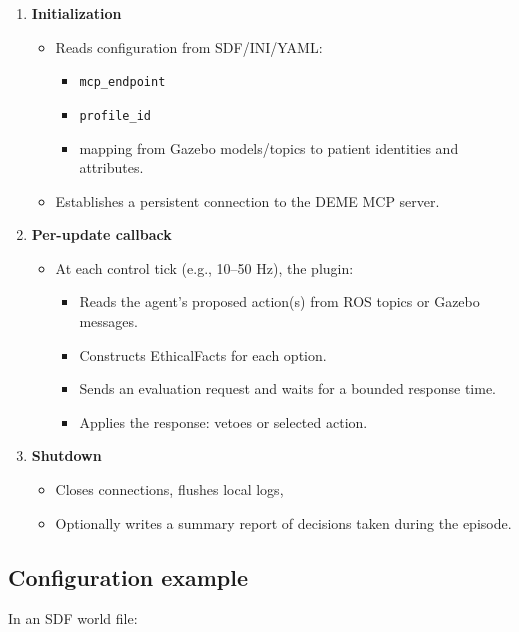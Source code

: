 \documentclass[11pt]{article}
\begin{document}
\begin{enumerate}
  \item \textbf{Initialization}
    \begin{itemize}
      \item Reads configuration from SDF/INI/YAML:
        \begin{itemize}
          \item \texttt{mcp\_endpoint}
          \item \texttt{profile\_id}
          \item mapping from Gazebo models/topics to patient identities and attributes.
        \end{itemize}
      \item Establishes a persistent connection to the DEME MCP server.
    \end{itemize}

  \item \textbf{Per-update callback}
    \begin{itemize}
      \item At each control tick (e.g., 10--50 Hz), the plugin:
        \begin{itemize}
          \item Reads the agent's proposed action(s) from ROS topics or Gazebo messages.
          \item Constructs EthicalFacts for each option.
          \item Sends an evaluation request and waits for a bounded response time.
          \item Applies the response: vetoes or selected action.
        \end{itemize}
    \end{itemize}

  \item \textbf{Shutdown}
    \begin{itemize}
      \item Closes connections, flushes local logs,
      \item Optionally writes a summary report of decisions taken during the episode.
    \end{itemize}
\end{enumerate}

\subsection{Configuration example}

In an SDF world file:
\end{document}
